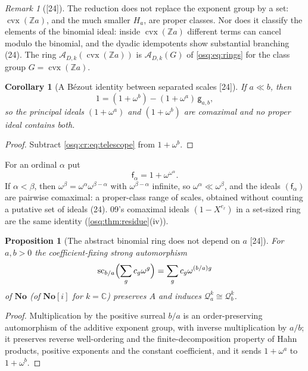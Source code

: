 \documentclass[11pt,letterpaper]{article}
\numberwithin{equation}{section}
\newtheorem{proposition}[proposition]{Proposition}
\newtheorem{corollary}[corollary]{Corollary}
\theoremstyle{definition}
\theoremstyle{remark}
\newtheorem{remark}[remark]{Remark}
\theoremstyle{plain}
\newcommand{\No}{\mathbf{No}}
\newcommand{\SC}{\No[i]}
\newcommand{\Z}{\mathbb Z}
\newcommand{\C}{\mathbb C}
\newcommand{\A}{\mathcal A}          %
\newcommand{\Qa}{\mathcal Q}         %
\newcommand{\src}[1]{\textup{\textsf{[#1]}}}
\begin{document}
\begin{remark}[\src{24}]\label{osq:cr:rem:tails}
The reduction does not replace the exponent group by a set: $\operatorname{cvx}(\Z a)$, and the much smaller $H_a$, are proper classes. Nor does it
classify the elements of the binomial ideal: inside $\operatorname{cvx}(\Z a)$ different terms can cancel modulo the binomial, and the dyadic
idempotents show substantial branching (24). The ring $\A_{D,k}(\operatorname{cvx}(\Z a))$ is $\A_{D,k}(G)$ of \eqref{osq:eq:rings} for the class group
$G=\operatorname{cvx}(\Z a)$.
\end{remark}

\begin{corollary}[A B\'ezout identity between separated scales \src{24}]\label{osq:cr:cor:comaximal}
If $a\ll b$, then
\begin{equation}\label{osq:cr:eq:bezout}
 1=(1+\omega^b)-(1+\omega^a)\,\mathsf g_{a,b},
\end{equation}
so the principal ideals $(1+\omega^a)$ and $(1+\omega^b)$ are comaximal and no proper ideal contains both.
\end{corollary}
\begin{proof}
Subtract \eqref{osq:cr:eq:telescope} from $1+\omega^b$.
\end{proof}

For an ordinal $\alpha$ put
\begin{equation}\label{osq:cr:eq:ordinalscales}
 \mathsf f_\alpha=1+\omega^{\omega^\alpha}.
\end{equation}
If $\alpha<\beta$, then $\omega^\beta=\omega^\alpha\omega^{\beta-\alpha}$ with $\omega^{\beta-\alpha}$ infinite, so $\omega^\alpha\ll\omega^\beta$, and the
ideals $(\mathsf f_\alpha)$ are pairwise comaximal: a proper-class range of scales, obtained without counting a putative set of ideals (24). 09's
comaximal ideals $(1-X^{e_\ell})$ in a set-sized ring are the same identity (\cref{osq:thm:residue}(iv)).

\begin{proposition}[The abstract binomial ring does not depend on $a$ \src{24}]\label{osq:cr:prop:rescale}
For $a,b>0$ the coefficient-fixing strong automorphism
\[
 \operatorname{sc}_{b/a}\Bigl(\sum_gc_g\omega^g\Bigr)=\sum_gc_g\omega^{(b/a)g}
\]
of $\No$ (of $\SC$ for $k=\C$) preserves $A$ and induces $\Qa^k_a\cong\Qa^k_b$.
\end{proposition}
\begin{proof}
Multiplication by the positive surreal $b/a$ is an order-preserving automorphism of the additive exponent group, with inverse multiplication by $a/b$;
it preserves reverse well-ordering and the finite-decomposition property of Hahn products, positive exponents and the constant coefficient, and it sends
$1+\omega^a$ to $1+\omega^b$.
\end{proof}
\end{document}
